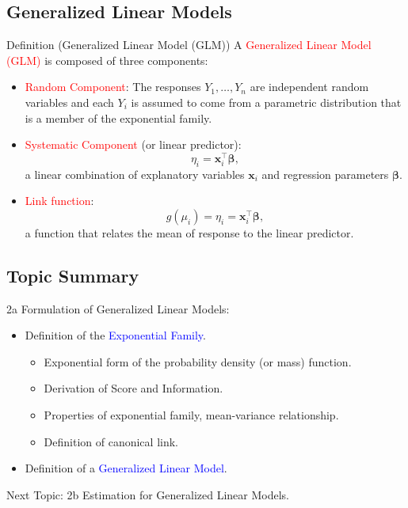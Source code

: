 \documentclass{article}\usepackage[]{graphicx}\usepackage[svgnames]{xcolor}
\providecommand{\Vector}[1]{\bm{#1}}%
\begin{document}
\subsection*{Generalized Linear Models}
\begin{Regular}{Definition (Generalized Linear Model (GLM))}
    A \textcolor{Red}{Generalized Linear Model (GLM)} is composed of three components:
    \begin{itemize}
        \item \textcolor{Red}{Random Component}: The responses $ Y_1,\ldots,Y_n $ are
              independent random variables and each $ Y_i $ is assumed to come from a parametric distribution that is a member of the
              exponential family.
        \item \textcolor{Red}{Systematic Component} (or linear predictor):
              \[ \eta_i=\Vector{x}_i^\top\Vector{\beta}, \]
              a linear combination of explanatory variables $ \Vector{x}_i $ and regression parameters $ \Vector{\beta} $.
        \item \textcolor{Red}{Link function}:
              \[ g(\mu_i)=\eta_i=\Vector{x}_i^\top\Vector{\beta}, \]
              a function that relates the mean of response to the linear predictor.
    \end{itemize}
\end{Regular}
\subsection*{Topic Summary}
2a Formulation of Generalized Linear Models:
\begin{itemize}
    \item Definition of the \textcolor{Blue}{Exponential Family}.
          \begin{itemize}
              \item Exponential form of the probability density (or mass) function.
              \item Derivation of Score and Information.
              \item Properties of exponential family, mean-variance relationship.
              \item Definition of canonical link.
          \end{itemize}
    \item Definition of a \textcolor{Blue}{Generalized Linear Model}.
\end{itemize}
Next Topic: 2b Estimation for Generalized Linear Models.
\end{document}

